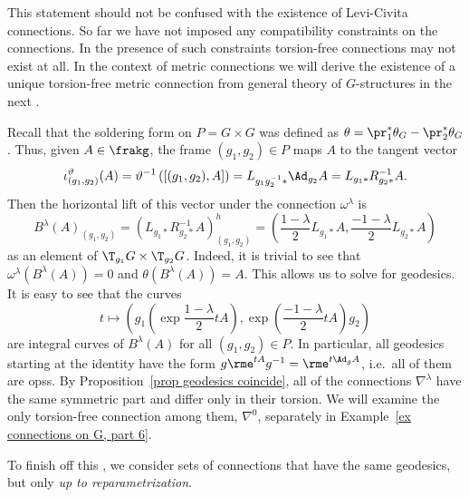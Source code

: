 \begin{rem}
    This statement should not be confused with the existence of Levi-Civita connections. So far we have not imposed any compatibility constraints on the connections. In the presence of such constraints torsion-free connections may not exist at all. In the context of metric connections we will derive the existence of a unique torsion-free metric connection from general theory of $G$-structures in the next \subsect.
\end{rem}



\begin{example}\label{ex connections on G, part 5}
    Recall that the soldering form on $P=G\times G$ was defined as $\theta=\pr_1^\ast\theta_G-\pr_2^\ast\theta_G$. Thus, given $A\in\frakg$, the frame $(g_1,g_2)\in P$ maps $A$ to the tangent vector 
    \[\iota_{(g_1,g_2)}^\vartheta(A)=\vartheta^{-1}\left([(g_1,g_2),A]\right)=L_{g_1g_2^{-1}\ast}\Ad_{g_2}A=L_{g_1\ast}R_{g_2\ast}^{-1}A.\]
    Then the horizontal lift of this vector under the connection $\omega^\lambda$ is 
    \[B^\lambda(A)_{(g_1,g_2)}=(L_{g_1\ast}R_{g_2\ast}^{-1}A)_{(g_1,g_2)}^h=\left(\frac{1-\lambda}{2}L_{g_1\ast}A, \frac{-1-\lambda}{2}L_{g_2\ast}A\right)\]
    as an element of $\T_{g_1}G\times \T_{g_2}G$. Indeed, it is trivial to see that $\omega^\lambda(B^\lambda(A))=0$ and $\theta(B^\lambda(A))=A$. 
    This allows us to solve for geodesics. It is easy to see that the curves 
    \[t\mapsto \left(g_1\left(\exp\frac{1-\lambda}{2}tA\right),\exp\left(\frac{-1-\lambda}{2}tA\right)g_2\right)\] 
    are integral curves of $B^\lambda(A)$ for all $(g_1,g_2)\in P$. In particular, all geodesics starting at the identity have the form $g\rme^{tA}g^{-1}=\rme^{t\Ad_g A}$, i.e.\ all of them are \glspl{ops}. By Proposition~\ref{prop geodesics coincide}, all of the connections $\nabla^\lambda$ have the same symmetric part and differ only in their torsion. We will examine the only torsion-free connection among them, $\nabla^0$, separately in Example~\ref{ex connections on G, part 6}.
\end{example}



To finish off this \subsect, we consider sets of connections that have the same geodesics, but only \emph{up to reparametrization}.


